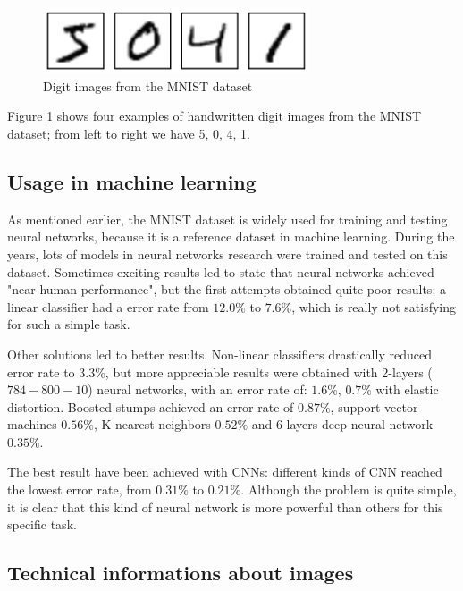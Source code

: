 \begin{figure}
	\centering
	\includegraphics[width=0.7\textwidth]{Images/MNIST_images}
	\caption{Digit images from the \acs{MNIST} dataset}
	\label{fig:MNIST_images}
\end{figure}

Figure \ref{fig:MNIST_images} shows four examples of handwritten digit images from the \acs{MNIST} dataset; from left to right we have 5, 0, 4, 1.

\subsection{Usage in machine learning}

As mentioned earlier, the \acs{MNIST} dataset is widely used for training and testing neural networks, because it is a reference dataset in machine learning. During the years, lots of models in neural networks research were trained and tested on this dataset. Sometimes exciting results led to state that neural networks achieved "near-human performance", but the first attempts obtained quite poor results: a linear classifier had a error rate from $12.0 \%$ to $7.6 \%$, which is really not satisfying for such a simple task.

Other solutions led to better results. Non-linear classifiers drastically reduced error rate to $3.3 \%$, but more appreciable results were obtained with 2-layers ($784-800-10$) neural networks, with an error rate of: $1.6 \%$, $0.7 \%$ with elastic distortion. Boosted stumps achieved an error rate of $0.87 \%$, support vector machines $0.56 \%$, K-nearest neighbors $0.52 \%$ and 6-layers deep neural network $0.35 \%$.

The best result have been achieved with \acsp{CNN}: different kinds of \acs{CNN} reached the lowest error rate, from $0.31 \%$ to $0.21 \%$. Although the problem is quite simple, it is clear that this kind of neural network is more powerful than others for this specific task.

\subsection{Technical informations about images}

